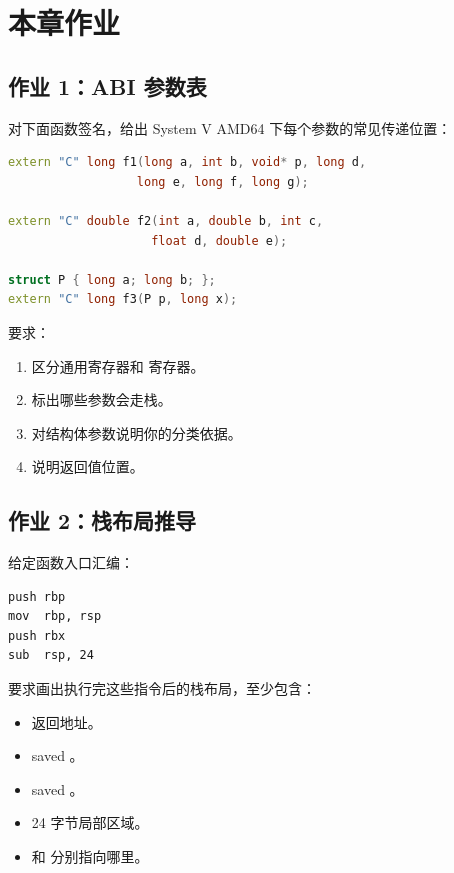 \section{本章作业}

\begin{exercisebox}
\subsection*{作业 1：ABI 参数表}

对下面函数签名，给出 System V AMD64 下每个参数的常见传递位置：

\begin{lstlisting}[language=C++]
extern "C" long f1(long a, int b, void* p, long d,
                  long e, long f, long g);

extern "C" double f2(int a, double b, int c,
                    float d, double e);

struct P { long a; long b; };
extern "C" long f3(P p, long x);
\end{lstlisting}

要求：

\begin{enumerate}
  \item 区分通用寄存器和  寄存器。
  \item 标出哪些参数会走栈。
  \item 对结构体参数说明你的分类依据。
  \item 说明返回值位置。
\end{enumerate}

\subsection*{作业 2：栈布局推导}

给定函数入口汇编：

\begin{lstlisting}
push rbp
mov  rbp, rsp
push rbx
sub  rsp, 24
\end{lstlisting}

要求画出执行完这些指令后的栈布局，至少包含：

\begin{itemize}
  \item 返回地址。
  \item saved 。
  \item saved 。
  \item 24 字节局部区域。
  \item {} 和  分别指向哪里。
\end{itemize}


\end{exercisebox}
